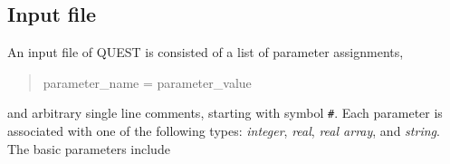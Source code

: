 \documentclass[12pt]{article}
\begin{document}
\subsection{Input file}\label{sec config}
An input file of QUEST is consisted of a list of parameter assignments,
\begin{quote}
parameter\_name = parameter\_value
\end{quote}
and arbitrary single line comments, starting with symbol \verb"#".
Each parameter is associated with one of the following types: \emph{integer}, \emph{real}, \emph{real array}, and \emph{string}.
The basic parameters include
\end{document}
